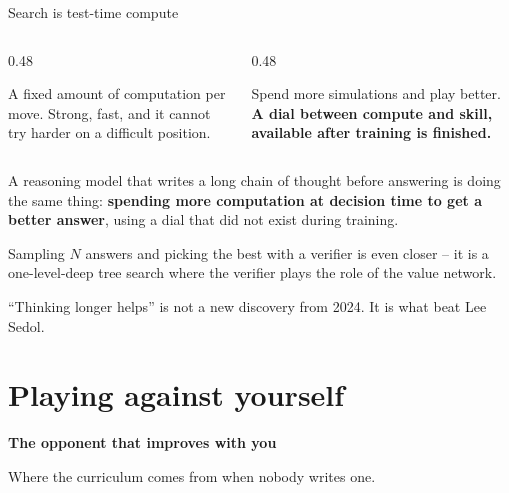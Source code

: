 \documentclass[aspectratio=169]{beamer}
\begin{document}
\begin{frame}{Search is test-time compute}
  \begin{columns}[T]
    \begin{column}{0.48\textwidth}
      \begin{tcolorbox}[colback=armblue!8, colframe=armblue, boxrule=0.6pt, arc=2pt,
                        title={\textbf{The network alone}}]
        \small
        A fixed amount of computation per move. Strong, fast, and it cannot try harder on a
        difficult position.
      \end{tcolorbox}
    \end{column}
    \begin{column}{0.48\textwidth}
      \begin{tcolorbox}[colback=paramgreen!8, colframe=paramgreen, boxrule=0.6pt, arc=2pt,
                        title={\textbf{The network plus search}}]
        \small
        Spend more simulations and play better. \textbf{A dial between compute and skill,
        available after training is finished.}
      \end{tcolorbox}
    \end{column}
  \end{columns}

  \vskip 10pt
  \begin{tcolorbox}[colback=armorange!12, colframe=armorange, boxrule=0.8pt, arc=2pt,
                    title={\textbf{Hold on to this idea for lecture 7}}]
    \small
    A reasoning model that writes a long chain of thought before answering is doing the same
    thing: \textbf{spending more computation at decision time to get a better answer}, using a
    dial that did not exist during training.

    \vskip 4pt
    Sampling $N$ answers and picking the best with a verifier is even closer -- it is a
    one-level-deep tree search where the verifier plays the role of the value network.
  \end{tcolorbox}

  \vskip 6pt
  \begin{center}
    \small
    ``Thinking longer helps'' is not a new discovery from 2024. It is what beat Lee Sedol.
  \end{center}
\end{frame}

\section{Playing against yourself}
\begin{frame}[plain]
  \begin{center}
    \vskip 1.6cm
    {\Huge\bfseries\color{popblue}The opponent that improves with you}

    \vskip 0.6cm
    {\large Where the curriculum comes from when nobody writes one.}
  \end{center}
\end{frame}
\end{document}
